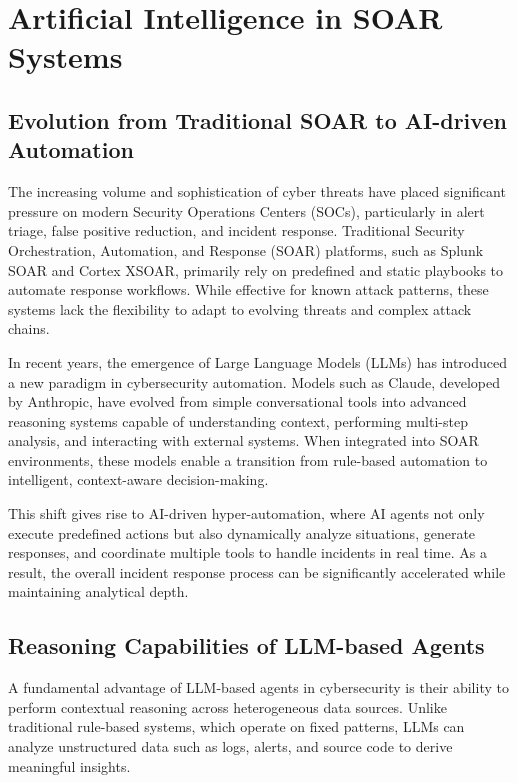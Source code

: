 \documentclass[12pt]{report}
\begin{document}
\section{Artificial Intelligence in SOAR Systems}

\subsection{Evolution from Traditional SOAR to AI-driven Automation}

The increasing volume and sophistication of cyber threats have placed significant pressure on modern Security Operations Centers (SOCs), particularly in alert triage, false positive reduction, and incident response. Traditional Security Orchestration, Automation, and Response (SOAR) platforms, such as Splunk SOAR and Cortex XSOAR, primarily rely on predefined and static playbooks to automate response workflows. While effective for known attack patterns, these systems lack the flexibility to adapt to evolving threats and complex attack chains.

In recent years, the emergence of Large Language Models (LLMs) has introduced a new paradigm in cybersecurity automation. Models such as Claude, developed by Anthropic, have evolved from simple conversational tools into advanced reasoning systems capable of understanding context, performing multi-step analysis, and interacting with external systems. When integrated into SOAR environments, these models enable a transition from rule-based automation to intelligent, context-aware decision-making.

This shift gives rise to AI-driven hyper-automation, where AI agents not only execute predefined actions but also dynamically analyze situations, generate responses, and coordinate multiple tools to handle incidents in real time. As a result, the overall incident response process can be significantly accelerated while maintaining analytical depth.

\subsection{Reasoning Capabilities of LLM-based Agents}

A fundamental advantage of LLM-based agents in cybersecurity is their ability to perform contextual reasoning across heterogeneous data sources. Unlike traditional rule-based systems, which operate on fixed patterns, LLMs can analyze unstructured data such as logs, alerts, and source code to derive meaningful insights.
\end{document}
